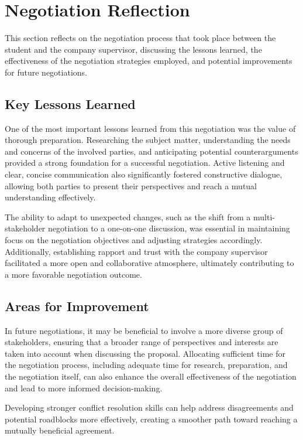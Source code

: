 \chapter{Negotiation Reflection}\label{chap:negotiation_reflection}

This section reflects on the negotiation process that took place between the student and the company supervisor, discussing the lessons learned, the effectiveness of the negotiation strategies employed, and potential improvements for future negotiations.


\section{Key Lessons Learned}

One of the most important lessons learned from this negotiation was the value of thorough preparation. Researching the subject matter, understanding the needs and concerns of the involved parties, and anticipating potential counterarguments provided a strong foundation for a successful negotiation. Active listening and clear, concise communication also significantly fostered constructive dialogue, allowing both parties to present their perspectives and reach a mutual understanding effectively.

The ability to adapt to unexpected changes, such as the shift from a multi-stakeholder negotiation to a one-on-one discussion, was essential in maintaining focus on the negotiation objectives and adjusting strategies accordingly. Additionally, establishing rapport and trust with the company supervisor facilitated a more open and collaborative atmosphere, ultimately contributing to a more favorable negotiation outcome.


\section{Areas for Improvement}

In future negotiations, it may be beneficial to involve a more diverse group of stakeholders, ensuring that a broader range of perspectives and interests are taken into account when discussing the proposal. Allocating sufficient time for the negotiation process, including adequate time for research, preparation, and the negotiation itself, can also enhance the overall effectiveness of the negotiation and lead to more informed decision-making.

Developing stronger conflict resolution skills can help address disagreements and potential roadblocks more effectively, creating a smoother path toward reaching a mutually beneficial agreement.


